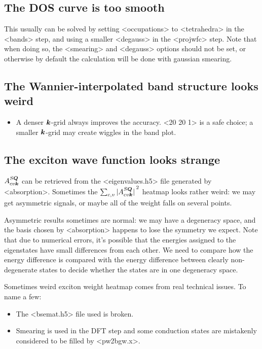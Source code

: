 \documentclass[hyperref, a4paper, 12pt]{report}
\def\texttt#1{<#1>}%
\newcommand{\shortcode}[1]{\texttt{#1}}
\begin{document}
\subsection{The DOS curve is too smooth}

This usually can be solved by 
setting \shortcode{occupations} to \shortcode{tetrahedra}
in the \shortcode{bands} step,
and using a smaller \shortcode{degauss} in the \shortcode{projwfc} step.
Note that when doing so, 
the \shortcode{smearing} and \shortcode{degauss} options 
should not be set, 
or otherwise by default the calculation will be done with gaussian smearing.

\subsection{The Wannier-interpolated band structure looks weird}

\begin{itemize}
    \item A denser $\vb*{k}$-grid always improves the accuracy. 
        \shortcode{20 20 1} is a safe choice; 
        a smaller $\vb*{k}$-grid may create wiggles in the band plot. 
\end{itemize}

\subsection{The exciton wave function looks strange} 

$A^{S\vb*{Q}}_{cv \vb*{k}}$ can be retrieved from 
the \shortcode{eigenvalues.h5} file generated by \shortcode{absorption}.
Sometimes the $\sum_{c, v} \abs*{A^{S \vb*{Q}}_{cv \vb*{k}}}^2$ 
heatmap looks rather weird: 
we may get asymmetric signals, 
or maybe all of the weight falls on several points. 

Asymmetric results sometimes are normal: 
we may have a degeneracy space, 
and the basis chosen by \shortcode{absorption} happens to 
lose the symmetry we expect. 
Note that due to numerical errors, 
it's possible that the energies assigned to the eigenstates 
have small differences from each other.
We need to compare how the energy difference is compared with the 
energy difference between clearly non-degenerate states 
to decide whether the states are in one degeneracy space. 

Sometimes weird exciton weight heatmap 
comes from real technical issues. To name a few: 
\begin{itemize}
    \item The \shortcode{bsemat.h5} file used is broken. 
    \item Smearing is used in the DFT step 
        and some conduction states are mistakenly considered to be filled 
        by \shortcode{pw2bgw.x}. 
\end{itemize}
\end{document}
